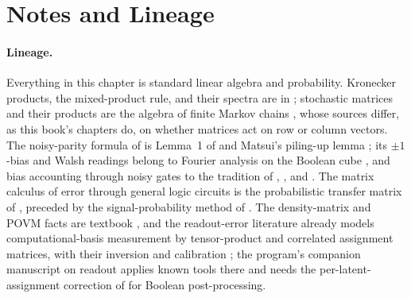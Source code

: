 %

\section{Notes and Lineage}
\label{sec:bib-notes-ch19}

\paragraph{Lineage.}
Everything in this chapter is standard linear algebra and probability.
Kronecker products, the mixed-product rule, and their spectra are in
\textcite{horn-johnson-matrix}; stochastic matrices and their products are
the algebra of finite Markov chains \parencite{levin-peres-wilmer-2017,mitzenmacher-upfal},
whose sources differ, as this book's chapters do, on whether matrices act
on row or column vectors. The noisy-parity formula of
 is Lemma~1 of \textcite{gallager-1962} and
Matsui's piling-up lemma \parencite{matsui-1993}; its $\pm 1$-bias and
Walsh readings belong to Fourier analysis on the Boolean cube
\parencite{odonnell-2014}, and bias accounting through noisy gates to the
tradition of \textcite{von-neumann-1956}, \textcite{pippenger-1988}, and
\textcite{evans-schulman-1999}. The matrix calculus of error through
general logic circuits is the probabilistic transfer matrix of
\textcite{krishnaswamy-et-al-2008}, preceded by the signal-probability
method of \textcite{parker-mccluskey-1975}. The density-matrix and POVM
facts are textbook \parencite{nielsen-chuang-2010}, and the readout-error
literature already models computational-basis measurement by
tensor-product and correlated assignment matrices, with their inversion
and calibration
\parencite{bravyi-et-al-2021,nation-et-al-2021,smith-et-al-2021,maciejewski-zimboras-oszmaniec-2020,maciejewski-et-al-2021,hamilton-et-al-2020};
the program's companion manuscript on readout
\parencite{towell-bernoulli-quantum-readout} applies known tools there and
needs the per-latent-assignment correction of
 for Boolean post-processing.

